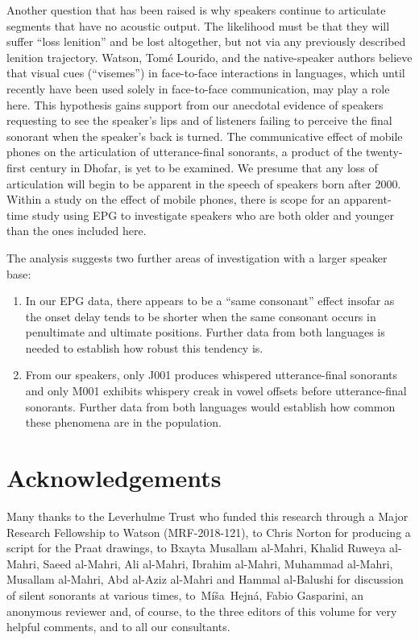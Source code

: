 \documentclass[output=paper]{langscibook}
\begin{document}
Another question that has been raised is why speakers continue to articulate segments that have no acoustic output. The likelihood must be that they will suffer ``loss lenition''
and be lost altogether, but not via any previously described lenition trajectory. Watson, Tomé Lourido, and the native-speaker authors believe that visual cues (``visemes'')
in face-to-face interactions in languages, which until recently have been used solely in face-to-face communication, may play a role here. This hypothesis gains support from our anecdotal evidence of speakers requesting to see the speaker’s lips and of listeners failing to perceive the final sonorant when the speaker’s back is turned. The communicative effect of mobile phones on the articulation of utterance-final sonorants, a product of the twenty-first century in Dhofar, is yet to be examined. We presume that any loss of articulation will begin to be apparent in the speech of speakers born after 2000. Within a study on the effect of mobile phones, there is scope for an apparent-time study using EPG to investigate speakers who are both older and younger than the ones included here.

The analysis suggests two further areas of investigation with a larger speaker base:

\begin{enumerate}
\item{In our EPG data, there appears to be a ``same consonant'' effect insofar as the onset delay tends to be shorter when the same consonant occurs in penultimate and ultimate positions. Further data from both languages is needed to establish how robust this tendency is.}

\item{From our speakers, only J001 produces whispered utterance-final sonorants and only M001 exhibits whispery creak in vowel offsets before utterance\hyp final sonorants. Further data from both languages would establish how common these phenomena are in the population.}
\end{enumerate}

\section{Acknowledgements}
\largerpage
Many thanks to the Leverhulme Trust who funded this research through a Major Research Fellowship to Watson (MRF-2018-121), to Chris Norton for producing a script for the Praat drawings, to Bxayta Musallam al-Mahri, Khalid Ruweya al-Mahri, Saeed al-Mahri, Ali al-Mahri, Ibrahim al-Mahri, Muhammad al-Mahri, Musallam al-Mahri, Abd al-Aziz al-Mahri and Hammal al-Balushi for discussion of silent sonorants at various times, to~Míša~Hejná, Fabio Gasparini, an anonymous reviewer and, of course, to the three editors of this volume for very helpful comments, and to all our consultants.
\end{document}
